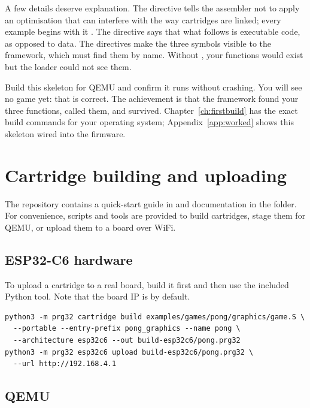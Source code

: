 A few details deserve explanation. The directive  tells the
assembler not to apply an optimisation that can interfere with the way \prg
cartridges are linked; every example begins with it \citep{prg32tutorialgraphic}.
The  directive says that what follows is executable code, as
opposed to data. The  directives make the three symbols visible to
the framework, which must find them by name. Without , your
functions would exist but the loader could not see them.

\begin{prgcheck}
Build this skeleton for QEMU and confirm it runs without crashing. You will see
no game yet: that is correct. The achievement is that the framework found your
three functions, called them, and survived. Chapter~\ref{ch:firstbuild} has the exact
build commands for your operating system; Appendix~\ref{app:worked} shows this
skeleton wired into the firmware.
\end{prgcheck}

\section{Cartridge building and uploading}

The repository contains a quick-start guide in  and documentation
in the  folder. For convenience, scripts and tools are provided to
build cartridges, stage them for QEMU, or upload them to a board over Wi\-Fi.

\subsection{ESP32-C6 hardware}

To upload a cartridge to a real board, build it first and then use the included
Python tool. Note that the board IP is  by default.

\begin{lstlisting}[style=bash,caption={Build and upload a portable cartridge to the board}]
python3 -m prg32 cartridge build examples/games/pong/graphics/game.S \
  --portable --entry-prefix pong_graphics --name pong \
  --architecture esp32c6 --out build-esp32c6/pong.prg32
python3 -m prg32 esp32c6 upload build-esp32c6/pong.prg32 \
  --url http://192.168.4.1
\end{lstlisting}

\subsection{QEMU}

